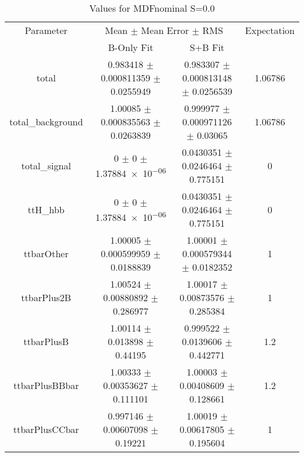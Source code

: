 \begin{table}
\centering
\caption{Values for MDFnominal S=0.0}
\begin{tabular}{cccc}
\toprule
Parameter & \multicolumn{2}{c}{Mean $\pm$ Mean Error $\pm$ RMS} & Expectation\\
 & B-Only Fit & S+B Fit & \\
\midrule
total & \num{0.983418} $\pm$ \num{0.000811359} $\pm$ \num{0.0255949} & \num{0.983307} $\pm$ \num{0.000813148} $\pm$ \num{0.0256539} & \num{1.06786}\\
total\_background & \num{1.00085} $\pm$ \num{0.000835563} $\pm$ \num{0.0263839} & \num{0.999977} $\pm$ \num{0.000971126} $\pm$ \num{0.03065} & \num{1.06786}\\
total\_signal & \num{0} $\pm$ \num{0} $\pm$ \num{1.37884e-06} & \num{0.0430351} $\pm$ \num{0.0246464} $\pm$ \num{0.775151} & \num{0}\\
ttH\_hbb & \num{0} $\pm$ \num{0} $\pm$ \num{1.37884e-06} & \num{0.0430351} $\pm$ \num{0.0246464} $\pm$ \num{0.775151} & \num{0}\\
ttbarOther & \num{1.00005} $\pm$ \num{0.000599959} $\pm$ \num{0.0188839} & \num{1.00001} $\pm$ \num{0.000579344} $\pm$ \num{0.0182352} & \num{1}\\
ttbarPlus2B & \num{1.00524} $\pm$ \num{0.00880892} $\pm$ \num{0.286977} & \num{1.00017} $\pm$ \num{0.00873576} $\pm$ \num{0.285384} & \num{1}\\
ttbarPlusB & \num{1.00114} $\pm$ \num{0.013898} $\pm$ \num{0.44195} & \num{0.999522} $\pm$ \num{0.0139606} $\pm$ \num{0.442771} & \num{1.2}\\
ttbarPlusBBbar & \num{1.00333} $\pm$ \num{0.00353627} $\pm$ \num{0.111101} & \num{1.00003} $\pm$ \num{0.00408609} $\pm$ \num{0.128661} & \num{1.2}\\
ttbarPlusCCbar & \num{0.997146} $\pm$ \num{0.00607098} $\pm$ \num{0.19221} & \num{1.00019} $\pm$ \num{0.00617805} $\pm$ \num{0.195604} & \num{1}\\
\bottomrule
\end{tabular}
\end{table}